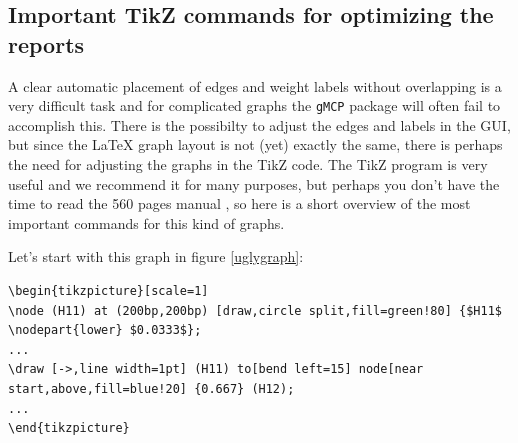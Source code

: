 \documentclass[a4paper, 11pt]{article}
\numberwithin{equation}{section}
\theoremstyle{definition}
\theoremstyle{plain}
\begin{document}
\subsection{Important TikZ commands for optimizing the reports}
A clear automatic placement of edges and weight labels without
overlapping is a very difficult task and for complicated graphs the
\texttt{gMCP} package will often fail to accomplish this.  There is
the possibilty to adjust the edges and labels in the GUI, but since
the {\LaTeX} graph layout is not (yet) exactly the same, there is
perhaps the need for adjusting the graphs in the TikZ code.  The TikZ
program is very useful and we recommend it for many purposes, but
perhaps you don't have the time to read the 560 pages manual
\cite{TikZ}, so here is a short overview of the most important
commands for this kind of graphs.

Let's start with this graph in figure \ref{uglygraph}:

\scriptsize
\lstset{language=[LaTeX]TeX}
\begin{lstlisting}
\begin{tikzpicture}[scale=1]
\node (H11) at (200bp,200bp) [draw,circle split,fill=green!80] {$H11$ \nodepart{lower} $0.0333$};
...
\draw [->,line width=1pt] (H11) to[bend left=15] node[near start,above,fill=blue!20] {0.667} (H12);
...
\end{tikzpicture}
\end{lstlisting}
\normalsize
\end{document}
